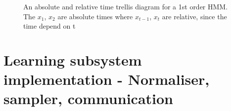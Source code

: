 \begin{frame}
\begin{figure}[htbp]
\caption[Absolute and relative time trellis diagram for an HMM]{An absolute and relative time trellis diagram for a 1st order HMM. The $x_{1}$, $x_{2}$ are absolute times where $x_{t-1}$, $x_{t}$ are relative, since the time depend on t}
\end{figure}\label{fig:4thMarkovModel}

\end{frame}
\section{Learning subsystem implementation - Normaliser, sampler, communication}

